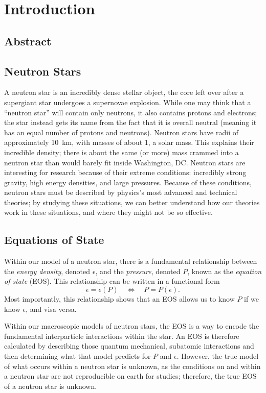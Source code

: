 \chapter{Introduction}

\section{Abstract}


\section{Neutron Stars}

A neutron star is an incredibly dense stellar object, the core left over after a supergiant star undergoes a supernovae explosion. While one may think that a ``neutron star'' will contain only neutrons, it also contains protons and electrons; the star instead gets its name from the fact that it is overall neutral (meaning it has an equal number of protons and neutrons). Neutron stars have radii of approximately \SI{10}{km}, with masses of about \SI{1}{\odot}, a solar mass. This explains their incredible density; there is about the same (or more) mass crammed into a neutron star than would barely fit inside Washington, DC. Neutron stars are interesting for research because of their extreme conditions: incredibly strong gravity, high energy densities, and large pressures. Because of these conditions, neutron stars must be described by physics's most advanced and technical theories; by studying these situations, we can better understand how our theories work in these situations, and where they might not be so effective.

\section{Equations of State}

Within our model of a neutron star, there is a fundamental relationship between the \textit{energy density}, denoted $\epsilon$, and the \textit{pressure}, denoted $P$, known as the \textit{equation of state} (EOS). This relationship can be written in a functional form
\[\epsilon = \epsilon(P) \quad\Longleftrightarrow\quad P = P(\epsilon). \]
Most importantly, this relationship shows that an EOS allows us to know $P$ if we know $\epsilon$, and visa versa. 

Within our macroscopic models of neutron stars, the EOS is a way to encode the fundamental interparticle interactions within the star. An EOS is therefore calculated by describing those quantum mechanical, subatomic interactions and then determining what that model predicts for $P$ and $\epsilon$. However, the true model of what occurs within a neutron star is unknown, as the conditions on and within a neutron star are not reproducible on earth for studies; therefore, the true EOS of a neutron star is unknown.

